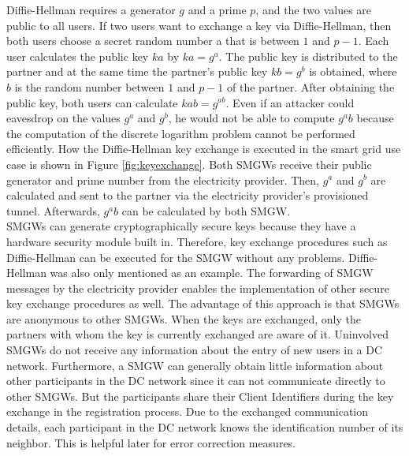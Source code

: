 Diffie-Hellman requires a generator $g$ and a prime $p$, and the two values are public to all users. If two users want to exchange a key via Diffie-Hellman, then both users choose a secret random number a that is between $1$ and $p-1$. Each user calculates the public key $ka$ by $ka=g^a$. The public key is distributed to the partner and at the same time the partner's public key $kb=g^b$ is obtained, where $b$ is the random number between $1$ and $p-1$ of the partner. After obtaining the public key, both users can calculate $kab=g^{ab}$.%
Even if an attacker could eavesdrop on the values $g^a$ and $g^b$, he would not be able to compute $g^ab$ because the computation of the discrete logarithm problem cannot be performed efficiently. How the Diffie-Hellman key exchange is executed in the smart grid use case is shown in Figure \ref{fig:keyexchange}. 
Both \gls{SMGW}s receive their public generator and prime number from the electricity provider. Then, $g^a$ and $g^b$ are calculated and sent to the partner via the electricity provider's provisioned tunnel. Afterwards, $g^ab$ can be calculated by both \gls{SMGW}.\\
\gls{SMGW}s can generate cryptographically secure keys because they have a hardware security module built in. Therefore, key exchange procedures such as Diffie-Hellman can be executed for the \gls{SMGW} without any problems. Diffie-Hellman was also only mentioned as an example. The forwarding of \gls{SMGW} messages by the electricity provider enables the implementation of other secure key exchange procedures as well. The advantage of this approach is that \gls{SMGW}s are anonymous to other \gls{SMGW}s. When the keys are exchanged, only the partners with whom the key is currently exchanged are aware of it. Uninvolved \gls{SMGW}s do not receive any information about the entry of new users in a DC network. Furthermore, a \gls{SMGW} can generally obtain little information about other participants in the DC network since it can not communicate directly to other \gls{SMGW}s. But the participants share their Client Identifiers during the key exchange in the registration process. Due to the exchanged communication details, each participant in the DC network knows the identification number of its neighbor. This is helpful later for error correction measures. %
